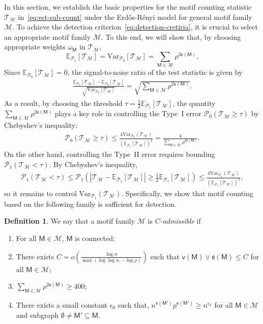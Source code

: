 \documentclass[letterpaper,11pt]{article}
\theoremstyle{definition}
\newtheorem{definition}{Definition}
\newcommand{\maM}{\mathcal{M}}
\newcommand{\maP}{\mathcal{P}}
\newcommand{\maT}{\mathcal{T}}
\newcommand{\nbr}[1]{{\sf\color{red}[#1]}}
\newcommand{\en}{\mathsf{{e}}}
\newcommand{\vn}{\mathsf{{v}}}
\newcommand{\pth}[1]{\left( #1 \right)}
\newcommand{\sfM}{{\mathsf{M}}}
\newcommand{\ER}{Erd\H{o}s-R\'enyi }
\def\var{\mathrm{Var}}
\def\E{\mathbb{E}}
\begin{document}



In this section, we establish the basic properties for the motif counting statistic $\maT_\maM$ in~\eqref{eq:est-sub-count} under the \ER model for general motif family $\maM$. To achieve the detection criterion~\eqref{eq:detection-cretiria}, it is crucial to select an appropriate motif family $\maM$. To this end, we will show that, by choosing appropriate weights $\omega_\sfM$ in $\maT_\maM$,
\[
\E_{\maP_1}\!\left[\maT_\maM\right] = \var_{\maP_0}\!\left[\maT_\maM\right] = \sum_{\sfM\in \maM}\rho^{2\en(\sfM)}.
\]
Since $\E_{\maP_0}[\maT_\maM] = 0$, the signal-to-noise ratio of the test statistic is given by
\begin{align}\label{eq:signal-to-noise}
    \frac{\E_{\maP_1}[\maT_\maM]-\E_{\maP_0}[\maT_\maM]}{\sqrt{\var_{\maP_0}[\maT_\maM]}}
= \sqrt{\sum_{\sfM\in \maM}\rho^{2\en(\sfM)}}.
\end{align}
As a result, by choosing the threshold $\tau=\frac{1}{2}\E_{\maP_1}[\maT_\maM]$, the quantity $\sum_{\sfM\in \maM}\rho^{2\en(\sfM)}$ plays a key role in controlling the Type~I error $\maP_0(\maT_\maM\ge \tau)$ by Chebyshev's inequality:
\begin{align}\label{eq:Chebyshev}
    \maP_0(\maT_\maM\ge \tau)\le \frac{4\var_{\maP_0}(\maT_\maM)}{(\E_{\maP_1}[\maT_\maM])^2} = \frac{4}{\sum_{\sfM\in \maM}\rho^{2\en(\sfM)}}.
\end{align}
On the other hand, controlling the Type~II error requires bounding $\maP_1(\maT_\maM<\tau)$. By Chebyshev's inequality,
\begin{align}
    \maP_1(\maT_\maM<\tau)\le \maP_1\pth{|\maT_\maM-\E_{\maP_1}[\maT_\maM]|\ge \frac{1}{2}\E_{\maP_1}[\maT_\maM]}\le \frac{4\var_{\maP_1}(\maT_\maM)}{(\E_{\maP_1}[\maT_\maM])^2},
\end{align}
so it remains to control $\var_{\maP_1}(\maT_\maM)$. Specifically, we show that motif counting based on the following family is sufficient for detection.

\begin{definition}\label{def:admissible}
We say that a motif family $\maM$ is \emph{$C$-admissible} if \begin{enumerate}
\item \label{cond:connect}For all $\sfM\in \maM$, $\sfM$ is connected;
    \item\label{cond:num} There exists $C=o\pth{\frac{\log n}{\max\pth{\log\log n,-\log\rho}}}$ such that $\vn(\sfM)\vee\en(\sfM)\le C$ for all $\sfM\in \maM$;
    \item\label{cond:signal-strength} $\sum_{\sfM\in \maM} \rho^{2\en(\sfM)}\ge 400$;
    \item\label{cond:subgraph} There exists a small constant $\epsilon_0$ such that, $n^{\vn(\sfM')} p^{\en(\sfM')}\ge n^{\epsilon_0}$ for all $\sfM\in \maM$ and subgraph $\emptyset\neq \sfM'\subseteq \sfM$. %
\end{enumerate}
\end{definition}
\end{document}
